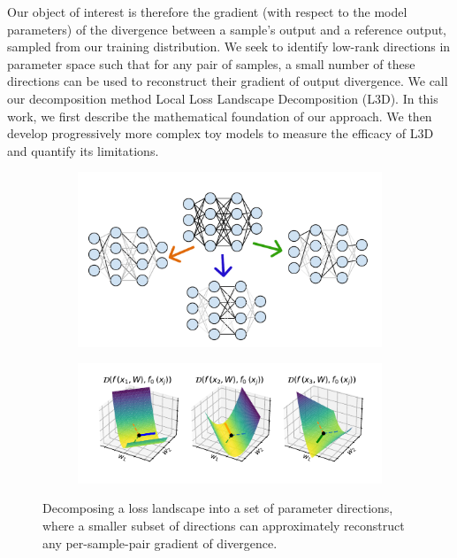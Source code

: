 \documentclass{article}
\theoremstyle{plain}
\theoremstyle{definition}
\theoremstyle{remark}
\begin{document}
Our object of interest is therefore the gradient (with respect to the model parameters) of the divergence between a sample's output and a reference output, sampled from our training distribution. We seek to identify low-rank directions in parameter space such that for any pair of samples, a small number of these directions can be used to reconstruct their gradient of output divergence. We call our decomposition method Local Loss Landscape Decomposition (L3D). In this work, we first describe the mathematical foundation of our approach. We then develop progressively more complex toy models to measure the efficacy of L3D and quantify its limitations. 




\begin{figure}
    \begin{subfigure}{\columnwidth}
        \centering
        \includegraphics[width=.7\textwidth]{../figures/1b_jacobian_diagram.pdf}
    \end{subfigure}
    \begin{subfigure}{\columnwidth}
        \centering
        \includegraphics[width=\textwidth]{../figures/1a_jacobian_diagram.pdf}
    \end{subfigure} \caption{Decomposing a loss landscape into a set of parameter directions, where a smaller subset of directions can approximately reconstruct any per-sample-pair gradient of divergence.}\label{fig:1_jacobian_diagram}
    
\end{figure}
\end{document}
